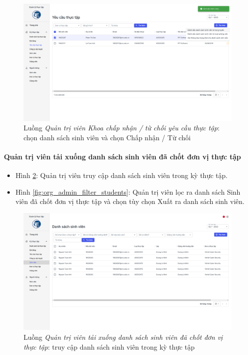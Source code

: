 \documentclass[./../main.tex]{subfiles}
\begin{document}
\begin{figure}[]
	\includegraphics[width=\linewidth]{./images/image73.png}
	\caption{Luồng \emph{Quản trị viên Khoa chấp nhận / từ chối yêu cầu thực tập}: chọn danh sách sinh viên và chọn Chấp nhận / Từ chối}
	\label{fig:org_admin_select_requests}
\end{figure}

\paragraph*{Quản trị viên tải xuống danh sách sinh viên đã chốt đơn vị thực tập}

\begin{itemize}
	\item Hình \ref{fig:org_admin_access_list_intern_students}: Quản trị viên truy cập danh sách sinh viên trong kỳ thực tập.
	\item Hình \ref{fig:org_admin_filter_students}: Quản trị viên lọc ra danh sách Sinh viên đã chốt đơn vị thực tập và chọn tùy chọn Xuất ra danh sách sinh viên.
\end{itemize}

\begin{figure}[]
	\includegraphics[width=\linewidth]{./images/image75.png}
	\caption{Luồng \emph{Quản trị viên tải xuống danh sách sinh viên đã chốt đơn vị thực tập}: truy cập danh sách sinh viên trong kỳ thực tập}
	\label{fig:org_admin_access_list_intern_students}
\end{figure}
\end{document}
